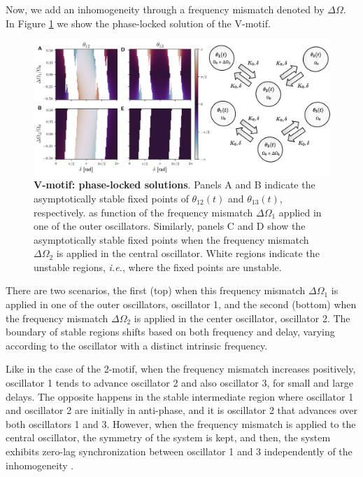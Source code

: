 \documentclass[../main.tex]{subfiles}
\begin{document}
Now, we add an inhomogeneity through a frequency mismatch denoted by $\Delta\Omega$.
In Figure \ref{fig:vmotif-synchronization} we show the phase-locked solution of the V-motif. 
\begin{figure}[!htb]
    \centering
    \includegraphics[width=\textwidth]{chapter2/figures/vmotif_same_omega_edited.png}
    \caption{\textbf{V-motif: phase-locked solutions}.
    Panels A and B indicate the asymptotically stable fixed points of $\theta_{12}(t)$ and $\theta_{13}(t)$, respectively. as function of the frequency mismatch $\Delta\Omega_1$ applied in one of the outer oscillators. Similarly, panels C and D show the asymptotically stable fixed points when the frequency mismatch $\Delta\Omega_2$ is applied in the central oscillator.
    White regions indicate the unstable regions, \textit{i.e.}, where the fixed points are unstable.}
    \label{fig:vmotif-synchronization}
\end{figure}
There are two scenarios, the first (top) when this frequency mismatch $\Delta\Omega_1$ is applied in one of the outer oscillators, oscillator 1, and the second (bottom) when the frequency mismatch $\Delta\Omega_2$ is applied in the center oscillator, oscillator 2.
The boundary of stable regions shifts based on both frequency and delay, varying according to the oscillator with a distinct intrinsic frequency.

Like in the case of the 2-motif, when the frequency mismatch increases positively, oscillator 1 tends to advance oscillator 2 and also oscillator 3, for small and large delays. 
The opposite happens in the stable intermediate region where oscillator 1 and oscillator 2 are initially in anti-phase, and it is oscillator 2 that advances over both oscillators 1 and 3.
However, when the frequency mismatch is applied to the central oscillator, the symmetry of the system is kept, and then, the system exhibits zero-lag synchronization between oscillator 1 and 3 independently of the inhomogeneity \citep{esfahani_zero-lag_2014}.
\end{document}
